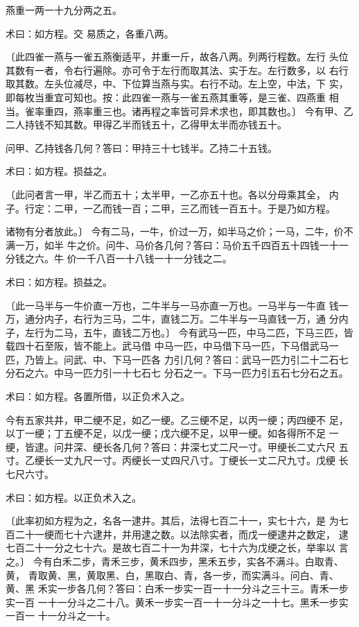 \documentclass[a4paper,12pt,UTF8,twoside]{ctexbook}
\begin{document}
燕重一两一十九分两之五。

术曰：如方程。交 易质之，各重八两。

〔此四雀一燕与一雀五燕衡适平，并重一斤，故各八两。列两行程数。左行 头位其数有一者，令右行遍除。亦可令于左行而取其法、实于左。左行数多，以 右行取其数。左头位减尽，中、下位算当燕与实。右行不动。左上空，中法，下 实，即每枚当重宜可知也。按：此四雀一燕与一雀五燕其重等，是三雀、四燕重 相当。雀率重四，燕率重三也。诸再程之率皆可异术求也，即其数也。〕 今有甲、乙二人持钱不知其数。甲得乙半而钱五十，乙得甲太半而亦钱五十。

问甲、乙持钱各几何？答曰：甲持三十七钱半。乙持二十五钱。

术曰：如方程。损益之。

〔此问者言一甲，半乙而五十；太半甲，一乙亦五十也。各以分母乘其全， 内子。行定：二甲，一乙而钱一百；二甲，三乙而钱一百五十。于是乃如方程。

诸物有分者放此。〕 今有二马，一牛，价过一万，如半马之价；一马，二牛，价不满一万，如半 牛之价。问牛、马价各几何？答曰：马价五千四百五十四钱一十一分钱之六。牛 价一千八百一十八钱一十一分钱之二。

术曰：如方程。损益之。

〔此一马半与一牛价直一万也，二牛半与一马亦直一万也。一马半与一牛直 钱一万，通分内子，右行为三马，二牛，直钱二万。二牛半与一马直钱一万，通 分内子，左行为二马，五牛，直钱二万也。〕 今有武马一匹，中马二匹，下马三匹，皆载四十石至阪，皆不能上。武马借 中马一匹，中马借下马一匹，下马借武马一匹，乃皆上。问武、中、下马一匹各 力引几何？答曰：武马一匹力引二十二石七分石之六。中马一匹力引一十七石七 分石之一。下马一匹力引五石七分石之五。

术曰：如方程。各置所借，以正负术入之。

今有五家共井，甲二绠不足，如乙一绠。乙三绠不足，以丙一绠；丙四绠不 足，以丁一绠；丁五绠不足，以戊一绠；戊六绠不足，以甲一绠。如各得所不足 一绠，皆逮。问井深、绠长各几何？答曰：井深七丈二尺一寸。甲绠长二丈六尺 五寸。乙绠长一丈九尺一寸。丙绠长一丈四尺八寸。丁绠长一丈二尺九寸。戊绠 长七尺六寸。

术曰：如方程。以正负术入之。

〔此率初如方程为之，名各一逮井。其后，法得七百二十一，实七十六，是 为七百二十一绠而七十六逮井，并用逮之数。以法除实者，而戊一绠逮井之数定， 逮七百二十一分之七十六。是故七百二十一为井深，七十六为戊绠之长，举率以 言之。〕 今有白禾二步，青禾三步，黄禾四步，黑禾五步，实各不满斗。白取青、黄， 青取黄、黑，黄取黑、白，黑取白、青，各一步，而实满斗。问白、青、黄、黑 禾实一步各几何？答曰：白禾一步实一百一十一分斗之三十三。青禾一步实一百 一十一分斗之二十八。黄禾一步实一百一十一分斗之一十七。黑禾一步实一百一 十一分斗之一十。
\end{document}
